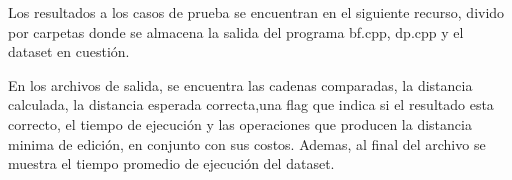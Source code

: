 Los resultados a los casos de prueba se encuentran en el siguiente recurso, divido
por carpetas donde se almacena la salida del programa bf.cpp, dp.cpp y el dataset en cuestión.

En los archivos de salida, se encuentra las cadenas comparadas, la distancia calculada,
la distancia esperada correcta,una flag que indica si el resultado esta correcto, el tiempo
de ejecución y las operaciones que producen la distancia minima de edición, en conjunto
con sus costos. Ademas, al final del archivo se muestra el tiempo promedio de ejecución del dataset.
